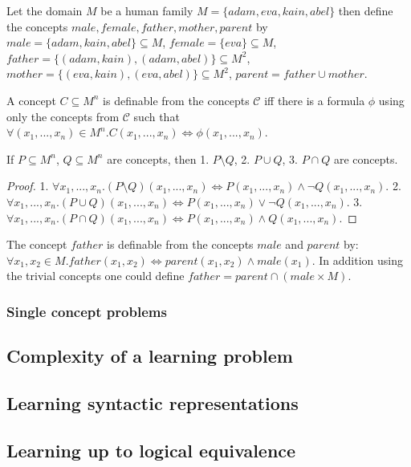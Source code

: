 \begin{exmp}
Let the domain $M$ be a human family $M=\{adam, eva, kain, abel\}$ then define the concepts $male, female, father, mother, parent$ by
$male=\{adam, kain, abel\}\subseteq{M}$,
$female=\{eva\}\subseteq{M}$,
$father=\{(adam,kain), (adam,abel)\}\subseteq{M^2}$,
$mother=\{(eva,kain), (eva,abel)\}\subseteq{M^2}$,
$parent=father \cup mother$.
\end{exmp}
\begin{defn}
A concept $C\subseteq M^n$ is definable from the concepts $\mathcal{C}$ iff there is a formula $\phi$ using only the concepts from $\mathcal{C}$ such that
$\forall (x_1, ..., x_n) \in M^n. C(x_1, ..., x_n) \iff \phi(x_1, ..., x_n)$.
\end{defn}
\begin{corollary}
If $P\subseteq{M^n}$, $Q\subseteq{M^n}$ are concepts, then
1. $P \setminus Q$, 2. $P \cup Q$, 3. $P \cap Q$ are concepts.
\end{corollary}
\begin{proof}
1. $\forall x_1, ..., x_n. (P \setminus Q)(x_1, ..., x_n) \iff
P(x_1, ..., x_n) \land \neg Q(x_1, ..., x_n)$.
2. $\forall x_1, ..., x_n. (P \cup Q)(x_1, ..., x_n) \iff
P(x_1, ..., x_n) \lor \neg Q(x_1, ..., x_n)$.
3. $\forall x_1, ..., x_n. (P \cap Q)(x_1, ..., x_n) \iff
P(x_1, ..., x_n) \land Q(x_1, ..., x_n)$.
\end{proof}

\begin{exmp}
The concept $father$ is definable from the concepts $male$ and $parent$ by:
$\forall x_1, x_2 \in M. father(x_1, x_2) \iff parent(x_1, x_2) \land male(x_1)$. In addition using the trivial concepts one could define
$father=parent \cap (male \times M)$.
\end{exmp}

\subsubsection{Single concept problems}

\subsection{Complexity of a learning problem}
\subsection{Learning syntactic representations}
\subsection{Learning up to logical equivalence}

